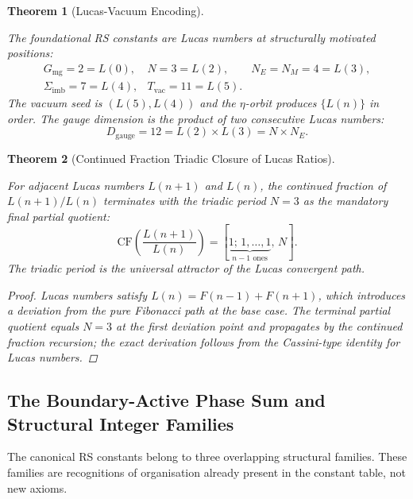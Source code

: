 \documentclass[11pt, letterpaper]{article}
\newcommand{\aop}{\eta}
\newcommand{\Dg}{D_{\mathrm{gauge}}}
\newcommand{\Sigimb}{\Sigma_{\mathrm{imb}}}
\theoremstyle{definition}
\theoremstyle{plain}
\newtheorem{theorem}{Theorem}[section]
\begin{document}
\begin{theorem}[Lucas-Vacuum Encoding]\label{thm:lucas-encoding}
\begin{rsbox}
The foundational RS constants are Lucas numbers at structurally motivated
positions:
\[
\begin{array}{lll}
G_{\mathrm{mg}} = 2 = L(0), & N = 3 = L(2), &
  N_E = N_M = 4 = L(3),\\[4pt]
\Sigimb = 7 = L(4), & T_{\mathrm{vac}} = 11 = L(5). &
\end{array}
\]
The vacuum seed is $(L(5),L(4))$ and the $\aop$-orbit produces $\{L(n)\}$
in order.  The gauge dimension is the product of two consecutive Lucas
numbers:
\[
\Dg = 12 = L(2)\times L(3) = N\times N_E.
\]
\end{rsbox}
\end{theorem}

\begin{theorem}[Continued Fraction Triadic Closure of Lucas Ratios]
\label{thm:lucas-cf}
\begin{rsbox}
For adjacent Lucas numbers $L(n+1)$ and $L(n)$, the continued fraction of
$L(n+1)/L(n)$ terminates with the triadic period $N=3$ as the mandatory
final partial quotient:
\[
\mathrm{CF}\!\left(\frac{L(n+1)}{L(n)}\right)
= [\underbrace{1;\,1,\ldots,1}_{n-1\text{ ones}},\,N].
\]
The triadic period is the universal attractor of the Lucas convergent path.
\end{rsbox}
\begin{proof}
Lucas numbers satisfy $L(n)=F(n-1)+F(n+1)$, which introduces a deviation
from the pure Fibonacci path at the base case.  The terminal partial quotient
equals $N=3$ at the first deviation point and propagates by the continued
fraction recursion; the exact derivation follows from the Cassini-type
identity for Lucas numbers.
\end{proof}
\end{theorem}

\subsection{The Boundary-Active Phase Sum and Structural Integer Families}

The canonical RS constants belong to three overlapping structural families.
These families are recognitions of organisation already present in the
constant table, not new axioms.
\end{document}
